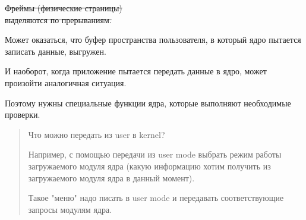 \sout{Фреймы (физические страницы) \\ выделяются по прерываниям.}

Может оказаться, что буфер пространства пользователя, в который ядро пытается записать данные, выгружен.

И наоборот, когда приложение пытается передать данные в ядро, может произойти аналогичная ситуация.

Поэтому нужны специальные функции ядра, которые выполняют необходимые проверки.

\begin{quote}
Что можно передать из user в kernel?

Например, с помощью передачи из user mode выбрать режим работы загружаемого модуля ядра (какую информацию хотим получить из загружаемого модуля ядра в данный момент).

Такое "меню" надо писать в user mode и передавать соответствующие запросы модулям ядра.
\end{quote}
